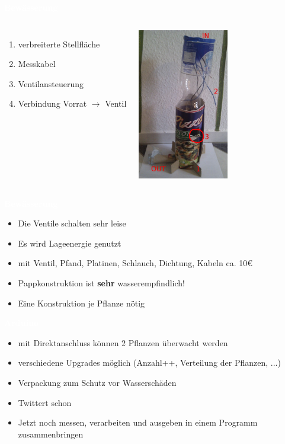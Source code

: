 \documentclass[bigger]{beamer}
\newcommand{\topic}[1]{{\huge{\textcolor{white}{\textbf{#1}}}}}
\begin{document}
\begin{frame}{\topic{Bewässerung}}
    \begin{columns}
        \begin{enumerate}
			\item verbreiterte Stellfläche
			\item Messkabel
			\item Ventilansteuerung
			\item Verbindung Vorrat $\rightarrow$ Ventil
        \end{enumerate}
        \includegraphics[width=150px]{System.jpg}
    \end{columns}
\end{frame} 

\begin{frame}{\topic{Bewässerung}}
	\begin{itemize}
		\item Die Ventile schalten sehr leise
		\item Es wird Lageenergie genutzt
		\item mit Ventil, Pfand, Platinen, Schlauch, Dichtung, Kabeln ca. 10\euro
		\newline
		\item Pappkonstruktion ist \textbf{sehr} wasserempfindlich!
		\item Eine Konstruktion je Pflanze nötig
	\end{itemize}
\end{frame} 


\begin{frame}{\topic{Arduino}}
	\begin{itemize}
		\item mit Direktanschluss können 2 Pflanzen überwacht werden
		\item verschiedene Upgrades möglich (Anzahl++, Verteilung der Pflanzen, ...)
		\item Verpackung zum Schutz vor Wasserschäden
		\item Twittert schon
		\newline
		\item Jetzt noch messen, verarbeiten und ausgeben in einem Programm zusammenbringen
	\end{itemize}
\end{frame}
\end{document}
